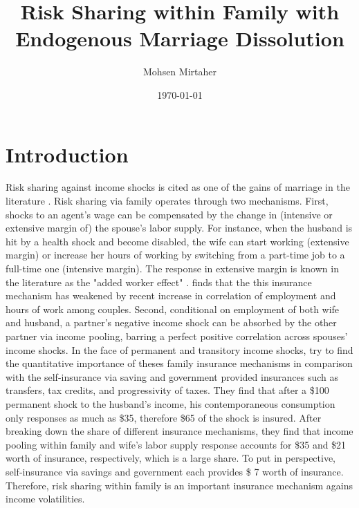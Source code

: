 





\title{Risk Sharing within Family with Endogenous Marriage Dissolution}
\author{Mohsen Mirtaher}
\date{\today}
\maketitle

\section{Introduction}

Risk sharing against income shocks is cited as one of the gains of marriage in the literature \citep{Chiappori_Mazzocco_2014}. Risk sharing via family operates through two mechanisms. First, shocks to an agent's wage can be compensated by the change in (intensive or extensive margin of) the spouse's labor supply. For instance, when the husband is hit by a health shock and become disabled, the wife can start working (extensive margin) or increase her hours of working by switching from a part-time job to a full-time one (intensive margin). The response in extensive margin is known in the literature as the "added worker effect" \citep{Hyslop_2001}. \citet{Juhn_Potter_2007} finds that the this insurance mechanism has weakened by recent increase in correlation of employment and hours of work among couples. Second, conditional on employment of both wife and husband,  a partner's negative income shock can be absorbed by the other partner via income pooling, barring a perfect positive correlation across spouses' income shocks. In the face of permanent and transitory income shocks, \citet{Blundell_etal_2015_Con-Ineq} try to find the quantitative importance of theses family insurance mechanisms in comparison with the self-insurance via saving and government provided insurances such as transfers, tax credits, and progressivity of taxes. They find that after a \$100 permanent shock to the husband's income, his contemporaneous consumption only responses as much as \$35, therefore \$65 of the shock is insured. After breaking down the share of different insurance mechanisms, they find that income pooling within family and wife's labor supply response accounts for \$35 and \$21 worth of insurance, respectively, which is a large share. To put in perspective, self-insurance via savings and government each provides \$ 7 worth of insurance. Therefore, risk sharing within family is an important insurance mechanism agains income volatilities.  \\


